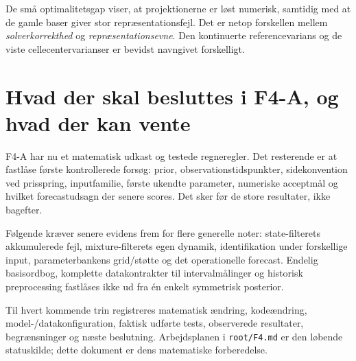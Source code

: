De små optimalitetsgap viser, at projektionerne er løst numerisk, samtidig med at de gamle baser giver stor repræsentationsfejl. Det er netop forskellen mellem \emph{solverkorrekthed} og \emph{repræsentationsevne}. Den kontinuerte referencevarians og de viste cellecentervarianser er bevidst navngivet forskelligt.

\section{Hvad der skal besluttes i F4-A, og hvad der kan vente}
F4-A har nu et matematisk udkast og testede regneregler. Det resterende er at fastlåse første kontrollerede forsøg: prior, observationstidspunkter, sidekonvention ved prisspring, inputfamilie, første ukendte parameter, numeriske acceptmål og hvilket forecastudsagn der senere scores. Det sker før de store resultater, ikke bagefter.

Følgende kræver senere evidens frem for flere generelle noter: state-filterets akkumulerede fejl, mixture-filterets egen dynamik, identifikation under forskellige input, parameterbankens grid/støtte og det operationelle forecast. Endelig basisordbog, komplette datakontrakter til intervalmålinger og historisk preprocessing fastlåses ikke ud fra én enkelt symmetrisk posterior.

Til hvert kommende trin registreres matematisk ændring, kodeændring, model-/datakonfiguration, faktisk udførte tests, observerede resultater, begrænsninger og næste beslutning. Arbejdsplanen i \texttt{root/F4.md} er den løbende statuskilde; dette dokument er dens matematiske forberedelse.



